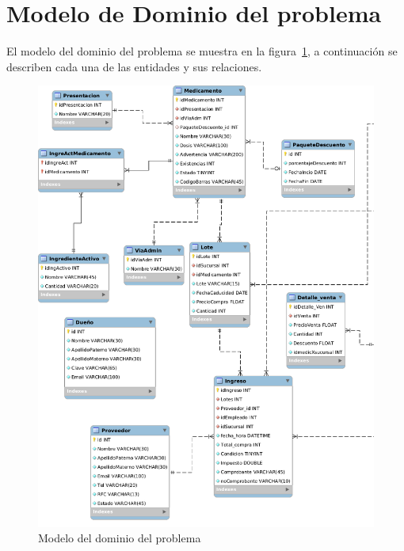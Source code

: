\section{Modelo de Dominio del problema}

	El modelo del dominio del problema se muestra en la figura~\ref{fig:modeloDeDominio}, a continuación se describen cada una de las entidades y sus relaciones.
	
\begin{figure}[htbp!]
	\begin{center}
		\includegraphics[width=.9\textwidth]{images/diagramaRelacional1}
		\caption{Modelo del dominio del problema}
		\label{fig:modeloDeDominio}
	\end{center}
\end{figure}

